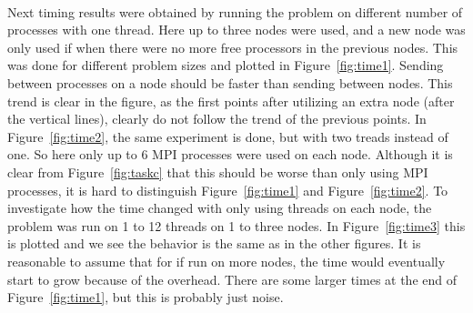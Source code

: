 \\
Next timing results were obtained by running the problem on different number of processes with one thread. Here up to three nodes were used, and a new node was only used if when there were no more free processors in the previous nodes. This was done for different problem sizes and plotted in Figure~\ref{fig:time1}. Sending between processes on a node should be faster than sending between nodes. This trend is clear in the figure, as the first points after utilizing an extra node (after the vertical lines), clearly do not follow the trend of the previous points. In Figure~\ref{fig:time2}, the same experiment is done, but with two treads instead of one. So here only up to 6 MPI processes were used on each node. Although it is clear from Figure~\ref{fig:taskc} that this should be worse than only using MPI processes, it is hard to distinguish Figure~\ref{fig:time1} and Figure~\ref{fig:time2}. To investigate how the time changed with only using threads on each node, the problem was run on 1 to 12 threads on 1 to three nodes. In Figure~\ref{fig:time3} this is plotted and we see the behavior is the same as in the other figures. It is reasonable to assume that for if run on more nodes, the time would eventually start to grow because of the overhead. There are some larger times at the end of Figure~\ref{fig:time1}, but this is probably just noise.\\
%
